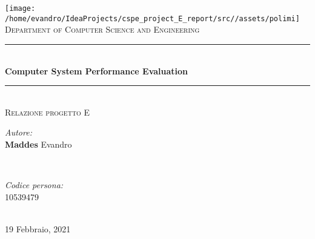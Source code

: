 \documentclass[a4paper, hidelinks, 12pt]{report}
\begin{document}
    \begin{titlepage}
        \centering
        \vspace*{0.7 cm}
        \texttt{[image: /home/evandro/IdeaProjects/cspe\_project\_E\_report/src//assets/polimi]}\\[1.6 cm]
        \textsc{\large Department of Computer Science and Engineering}\\[1.8 cm]

        \rule{\linewidth}{0.2 mm} \\[0.4 cm]
        { \huge \bfseries Computer System Performance Evaluation }\\
        \rule{\linewidth}{0.2 mm} \\[1.5 cm]

        \textsc{\Large Relazione progetto E}\\[0.5 cm]

        \begin{minipage}{0.4\textwidth}
            \begin{flushleft} \large
            \emph{Autore:}\\
            \textbf{Maddes} Evandro \\
            \end{flushleft}
        \end{minipage}~
        \begin{minipage}{0.4\textwidth}
            \begin{flushright} \large
            \emph{Codice persona:} \\
            10539479 \\
            \end{flushright}
        \end{minipage}\\[2 cm]

        {\large 19 Febbraio, 2021}\\[2 cm]

        \vfill
    \end{titlepage}

    \tableofcontents
    \newpage
    \listoftables
    \newpage
    \listoffigures
    \clearpage
    \setcounter{page}{1}
%
    \newpage
    
    
    
    
    
\end{document}
